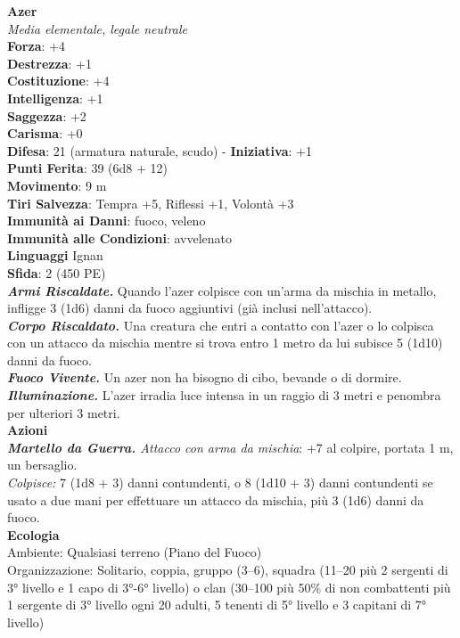 \begin{multicols}{2}
\medskip\textbf{Azer}\\
\emph{Media elementale, legale neutrale}\\
\textbf{Forza}: +4\\
\textbf{Destrezza}: +1\\
\textbf{Costituzione}: +4\\
\textbf{Intelligenza}: +1\\
\textbf{Saggezza}: +2\\
\textbf{Carisma}: +0\\
\textbf{Difesa}: 21 (armatura naturale, scudo) - \textbf{Iniziativa}: +1\\
\textbf{Punti Ferita}: 39 (6d8 + 12)\\
\textbf{Movimento}: 9 m\\
\textbf{Tiri Salvezza}: Tempra +5, Riflessi +1, Volontà +3\\
\textbf{Immunità ai Danni}: fuoco, veleno\\
\textbf{Immunità alle Condizioni}: avvelenato\\
\textbf{Linguaggi} Ignan\\
\textbf{Sfida}: 2 (450 PE)\smallskip\\
\emph{\textbf{Armi Riscaldate.}} Quando l'azer colpisce con un'arma da mischia in metallo, infligge 3 (1d6) danni da fuoco aggiuntivi (già inclusi nell'attacco).\\
\emph{\textbf{Corpo Riscaldato.}} Una creatura che entri a contatto con l'azer o lo colpisca con un attacco da mischia mentre si trova entro 1 metro da lui subisce 5 (1d10) danni da fuoco.\\
\emph{\textbf{Fuoco Vivente.}} Un azer non ha bisogno di cibo, bevande o di dormire.\\
\emph{\textbf{Illuminazione.}} L'azer irradia luce intensa in un raggio di 3 metri e penombra per ulteriori 3 metri.\\
\smallskip\textbf{Azioni}\\
\emph{\textbf{Martello da Guerra.} Attacco con arma da mischia}: +7 al colpire, portata 1 m, un bersaglio.\\
\emph{Colpisce:} 7 (1d8 + 3) danni contundenti, o 8 (1d10 + 3) danni contundenti se usato a due mani per effettuare un attacco da mischia, più 3 (1d6) danni da fuoco.\\
\textbf{Ecologia}\\
Ambiente: Qualsiasi terreno (Piano del Fuoco)\\
Organizzazione: Solitario, coppia, gruppo (3–6), squadra (11–20 più 2 sergenti di 3° livello e 1 capo di 3°-6° livello) o clan (30–100 più 50\% di non combattenti più 1 sergente di 3° livello ogni 20 adulti, 5 tenenti di 5° livello e 3 capitani di 7° livello)\\

\end{multicols}
